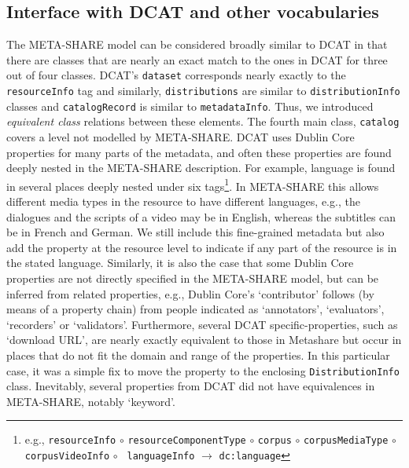 \documentclass{llncs}
\begin{document}
\subsection{Interface with DCAT and other vocabularies}
\label{sec:dcat}
The META-SHARE model can be considered broadly similar to DCAT in that there are
classes that are nearly an exact match to the ones in DCAT for three out of four
classes. DCAT's {\tt dataset} corresponds nearly exactly to the {\tt resourceInfo} tag and similarly, {\tt distributions} are similar to {\tt distributionInfo} 
classes and {\tt catalogRecord} is similar to {\tt metadataInfo}. Thus, we
introduced \emph{equivalent class} relations between these elements. The
fourth main class, {\tt catalog} covers a level not modelled by META-SHARE.
DCAT uses Dublin Core properties for many parts of the metadata, and often these
properties are found deeply nested in the META-SHARE description. For example, language
is found in several places deeply nested under six
tags\footnote{e.g., {\tt resourceInfo} $\circ$ {\tt resourceComponentType}
    $\circ$ {\tt corpus} $\circ$ {\tt corpusMediaType} $\circ$ {\tt corpusVideoInfo}
    $\circ$ {\tt
languageInfo} $\rightarrow$ {\tt dc:language}}. In META-SHARE this allows different media types in the resource
to have different languages, e.g., the dialogues and the scripts of a video may
be in English, whereas the subtitles can be in French and German.
We still include this fine-grained metadata but also add the property at the resource level
to indicate if any part of the resource is in the stated language.
Similarly, it is also the case that some Dublin Core properties are not directly
specified in the META-SHARE model, but can be inferred from related properties,
e.g., Dublin Core's `contributor' follows (by means of a property chain) from people indicated as `annotators',
`evaluators', `recorders' or `validators'. Furthermore, several DCAT specific-properties, such as `download URL', are nearly
exactly equivalent to those in Metashare but occur in places that do not fit the
domain and range of the properties. In this particular case, it was a simple fix
to move the property to the enclosing {\tt DistributionInfo} class.
Inevitably, several properties from DCAT did not have equivalences in
META-SHARE, notably `keyword'.
\end{document}

